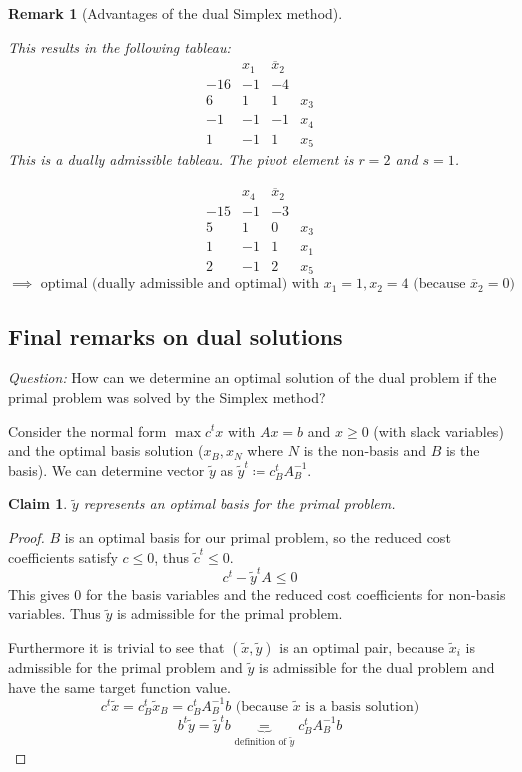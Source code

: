 \documentclass[a4paper]{article}
\numberwithin{lecref}{subsection}
\newtheorem*{Claim}{Claim}
\newtheorem*{Remark}{Remark}
\begin{document}
\begin{Remark}[Advantages of the dual Simplex method]
\begin{itemize}
			This results in the following tableau:
			\[\begin{array}{c|ccc}
				& x_1 & \overline x_2 & \\
				-16 & -1 & -4 & \\
				\hline
				6 & 1 & 1 & x_3 \\
				-1 & -1 & -1 & x_4 \\
				1 & -1 & 1 & x_5
			\end{array}\]
			This is a dually admissible tableau. The pivot element is $r=2$ and $s=1$.

			\[\begin{array}{c|ccc}
				& x_4 & \overline x_2 & \\
				-15 & -1 & -3 & \\
				\hline
				5 & 1 & 0 & x_3 \\
				1 & -1 & 1 & x_1 \\
				2 & -1 & 2 & x_5
			\end{array}\]
			\[ \implies \text{ optimal (dually admissible and optimal) with } x_1 = 1, x_2 = 4 \text{ (because $\overline x_2 = 0$)} \]
	\end{itemize}
\end{Remark}

\subsection{Final remarks on dual solutions}
\label{section:4.5}

\emph{Question:} How can we determine an optimal solution of the dual problem if the primal problem was solved by the Simplex method?

Consider the normal form $\max c^t x$ with $Ax = b$ and $x \geq 0$ (with slack variables) and the optimal basis solution ($x_B, x_N$ where $N$ is the non-basis and $B$ is the basis).
We can determine vector $\tilde y$ as $\tilde y^t \coloneqq c_B^t A_B^{-1}$.

\begin{Claim}
	$\tilde y$ represents an optimal basis for the primal problem.
\end{Claim}

\begin{proof}
	$B$ is an optimal basis for our primal problem, so the reduced cost coefficients satisfy $c \leq 0$, thus $\tilde c^t \leq 0$.
	\[ c^t - \tilde y^t A \leq 0 \]
	This gives $0$ for the basis variables and the reduced cost coefficients for non-basis variables.
	Thus $\tilde y$ is admissible for the primal problem.

	Furthermore it is trivial to see that $(\tilde x, \tilde y)$ is an optimal pair, because $\tilde x_i$ is admissible for the primal problem and $\tilde y$ is admissible for the dual problem and have the same target function value.
	\[ c^t \tilde x = c_B^t \tilde x_B = c_B^t A_B^{-1} b \text{ (because $\tilde x$ is a basis solution)} \]
	\[ b^t \tilde y = \tilde y^t b \underbrace{=}_{\text{definition of } \tilde y} c_B^t A_B^{-1} b \]
\end{proof}
\end{document}
